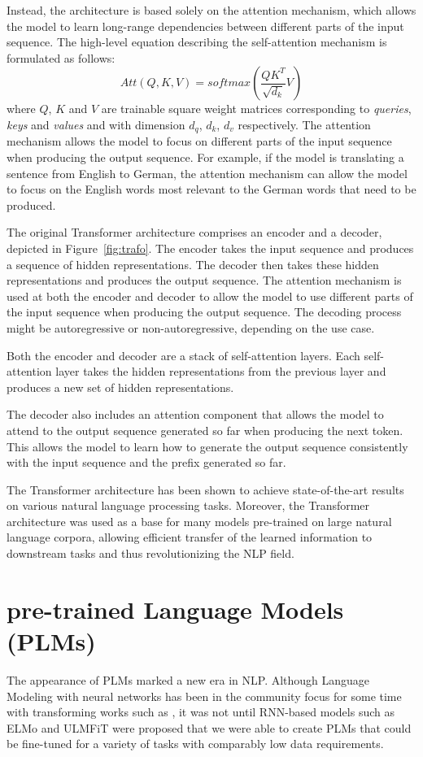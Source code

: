 Instead, the architecture is based solely on the attention mechanism, which allows the model to learn long-range dependencies between different parts of the input sequence.
The high-level equation describing the self-attention mechanism is formulated as follows:
\begin{equation*}
    Att(Q,K,V) = softmax\left(\frac{QK^T}{\sqrt{d_k}}V\right)
\end{equation*}
where $Q$, $K$ and $V$ are trainable square weight matrices corresponding to \emph{queries}, \emph{keys} and \emph{values} and with dimension $d_q$, $d_k$, $d_v$ respectively.
The attention mechanism allows the model to focus on different parts of the input sequence when producing the output sequence.
For example, if the model is translating a sentence from English to German, the attention mechanism can allow the model to focus on the English words most relevant to the German words that need to be produced.

The original Transformer architecture comprises an encoder and a decoder, depicted in Figure~\ref{fig:trafo}.
The encoder takes the input sequence and produces a sequence of hidden representations.
The decoder then takes these hidden representations and produces the output sequence.
The attention mechanism is used at both the encoder and decoder to allow the model to use different parts of the input sequence when producing the output sequence.
The decoding process might be autoregressive or non-autoregressive, depending on the use case.

Both the encoder and decoder are a stack of self-attention layers.
Each self-attention layer takes the hidden representations from the previous layer and produces a new set of hidden representations.

The decoder also includes an attention component that allows the model to attend to the output sequence generated so far when producing the next token.
This allows the model to learn how to generate the output sequence consistently with the input sequence and the prefix generated so far.

The Transformer architecture has been shown to achieve state-of-the-art results on various natural language processing tasks. 
Moreover, the Transformer architecture was used as a base for many models pre-trained on large natural language corpora, allowing efficient transfer of the learned information to downstream tasks and thus revolutionizing the NLP field.

\section{pre-trained Language Models (PLMs)}
\label{background:plms}
The appearance of PLMs marked a new era in NLP.
Although Language Modeling with neural networks has been in the community focus for some time with transforming works such as  \citet{mikolov2010recurrent,mikolov2013distributed}, it was not until RNN-based models such as ELMo \cite{peters-etal-2018-deep} and ULMFiT \cite{howard-ruder-2018-universal} were proposed that we were able to create PLMs that could be fine-tuned for a variety of tasks with comparably low data requirements.

